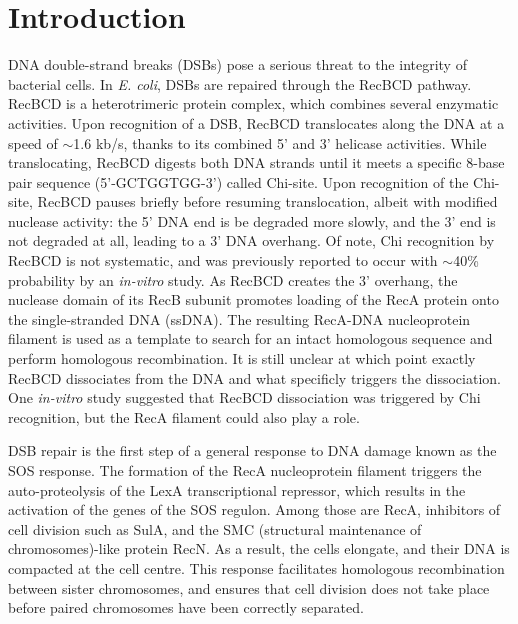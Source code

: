 \section*{Introduction}

DNA double-strand breaks (DSBs) pose a serious threat to the integrity of bacterial cells.
In \emph{E. coli}, DSBs are repaired through the RecBCD pathway. RecBCD is a heterotrimeric protein complex, which combines several enzymatic activities\cite{Dillingham2008}. Upon recognition of a DSB, RecBCD translocates along the DNA at a speed of $\sim$1.6 kb/s, thanks to its combined 5' and 3' helicase activities\cite{Wiktor2018}. While translocating, RecBCD digests both DNA strands until it meets a specific 8-base pair sequence (5'-GCTGGTGG-3') called Chi-site. Upon recognition of the Chi-site, RecBCD pauses briefly before resuming translocation, albeit with modified nuclease activity: the 5' DNA end is be degraded more slowly, and the 3' end is not degraded at all, leading to a 3' DNA overhang. Of note, Chi recognition by RecBCD is not systematic, and was previously reported to occur with $\sim$40\% probability by an \emph{in-vitro} study\cite{Taylor1992}. As RecBCD creates the 3' overhang, the nuclease domain of its RecB subunit promotes loading of the RecA protein onto the single-stranded DNA (ssDNA)\cite{Churchill2000, Spies2006}. The resulting RecA-DNA nucleoprotein filament is used as a template to search for an intact homologous sequence and perform homologous recombination. It is still unclear at which point exactly RecBCD dissociates from the DNA and what specificly triggers the dissociation. One \emph{in-vitro} study suggested that RecBCD dissociation was triggered by Chi recognition\cite{Taylor1999}, but the RecA filament could also play a role.

DSB repair is the first step of a general response to DNA damage known as the SOS response\cite{Baharoglu2014}. The formation of the RecA nucleoprotein filament triggers the auto-proteolysis of the LexA transcriptional repressor, which results in the activation of the genes of the SOS regulon. Among those are RecA, inhibitors of cell division such as SulA, and the SMC (structural maintenance of chromosomes)-like protein RecN. As a result, the cells elongate\cite{Bos2015}, and their DNA is compacted at the cell centre\cite{Odsbu2014}. This response facilitates homologous recombination between sister chromosomes, and ensures that cell division does not take place before paired chromosomes have been correctly separated.

